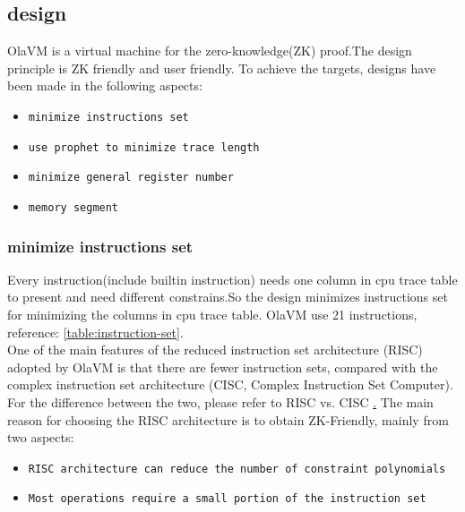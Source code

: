 \subsection{design}\label{subsec: vm-design}
OlaVM is a virtual machine for the zero-knowledge(ZK) proof.The design principle is ZK friendly and user friendly.
To achieve the targets, designs have been made in the following aspects:

\begin{itemize}
    \item \verb|minimize instructions set|
    \item \verb|use prophet to minimize trace length|
    \item \verb|minimize general register number|
    \item \verb|memory segment|
\end{itemize}

\subsubsection{minimize instructions set}
Every instruction(include builtin instruction) needs one column in cpu trace table to present and need different constrains.So the design minimizes instructions set for minimizing the columns in cpu trace table.
OlaVM use 21 instructions, reference: \ref{table:instruction-set}. \\
One of the main features of the reduced instruction set architecture (RISC) adopted by OlaVM is that there are fewer instruction sets, compared with the complex instruction set architecture (CISC, Complex Instruction Set Computer).
For the difference between the two, please refer to RISC vs. CISC \href{https://cs.stanford.edu/people/eroberts/courses/soco/projects/risc/risccisc/}.
The main reason for choosing the RISC architecture is to obtain ZK-Friendly, mainly from two aspects:

\begin{itemize}
    \item \verb|RISC architecture can reduce the number of constraint polynomials|
    \item \verb|Most operations require a small portion of the instruction set|
\end{itemize}

